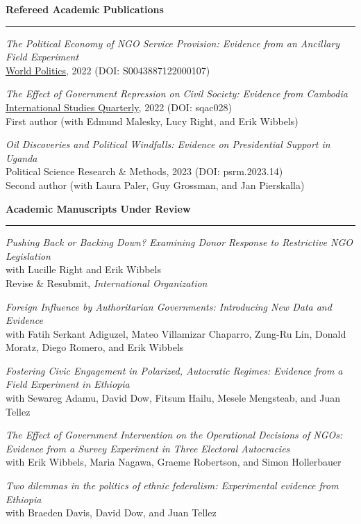 \documentclass[11pt]{article}
\begin{document}
\textbf{\large Refereed Academic Publications}\\
\rule[3mm]{\textwidth}{.2pt}
{\sl The Political Economy of NGO Service Provision: Evidence from an Ancillary Field Experiment}\\
\href{https://www.cambridge.org/core/journals/world-politics/article/abs/political-economy-of-ngo-service-provision/D5265B6C0EA842B788BCB309EF4E5178}{World Politics}, 2022 (DOI: S0043887122000107)

{\sl The Effect of Government Repression on Civil Society: Evidence from Cambodia}\\
\href{https://academic.oup.com/isq/article-abstract/66/3/sqac028/6631078?redirectedFrom=fulltext&login=false}{International Studies Quarterly}, 2022 (DOI: sqac028)\\
First author (with Edmund Malesky, Lucy Right, and Erik Wibbels)

{\sl Oil Discoveries and Political Windfalls: Evidence on Presidential Support in Uganda}\\
Political Science Research \& Methods, 2023 (DOI: psrm.2023.14)\\
Second author (with Laura Paler, Guy Grossman, and Jan Pierskalla)

\textbf{\large Academic Manuscripts Under Review}\\
\rule[3mm]{\textwidth}{.2pt}
{\sl Pushing Back or Backing Down? Examining Donor Response to Restrictive NGO Legislation}\\
with Lucille Right and Erik Wibbels\\
Revise \& Resubmit, \textit{International Organization}

{\sl Foreign Influence by Authoritarian Governments: Introducing New Data and Evidence}\\
with Fatih Serkant Adiguzel, Mateo Villamizar Chaparro, Zung-Ru Lin, Donald Moratz, Diego Romero, and Erik Wibbels

{\sl Fostering Civic Engagement in Polarized, Autocratic Regimes: Evidence from a Field Experiment in Ethiopia}\\
with Sewareg Adamu, David Dow, Fitsum Hailu, Mesele Mengsteab, and Juan Tellez

{\sl The Effect of Government Intervention on the Operational Decisions of NGOs: Evidence from a Survey Experiment in Three Electoral Autocracies}\\
with Erik Wibbels, Maria Nagawa, Graeme Robertson, and Simon Hollerbauer

{\sl Two dilemmas in the politics of ethnic federalism: Experimental evidence from Ethiopia}\\
with Braeden Davis, David Dow, and Juan Tellez
\end{document}
